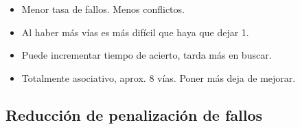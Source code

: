 \documentclass[12pt, twoside, openright]{report} %
\begin{document}
\begin{itemize}
	      \begin{itemize}

		      \item Menor tasa de fallos. Menos conflictos.
		      \item Al haber más vías es más difícil que haya que dejar 1.
		      \item Puede incrementar tiempo de acierto, tarda más en buscar.
		      \item Totalmente asociativo, aprox. 8 vías. Poner más deja de mejorar.
	      \end{itemize}
\end{itemize}

\subsection{Reducción de penalización de fallos}
\end{document}
